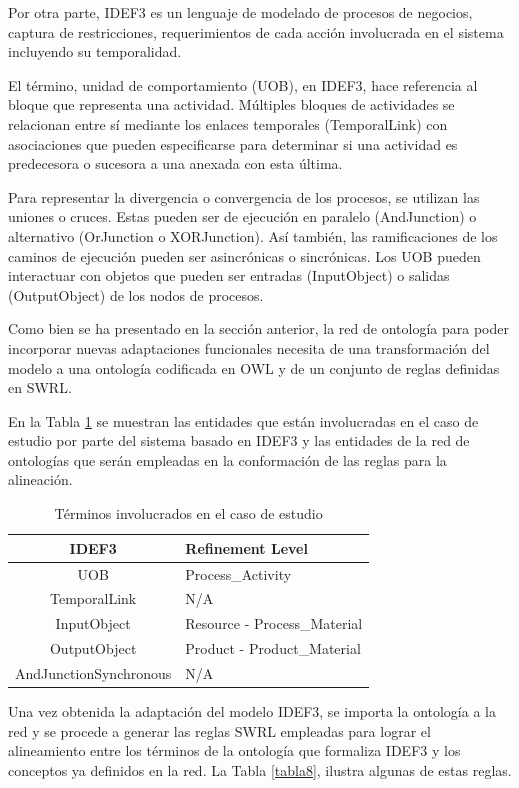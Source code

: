\documentclass[journal]{IEEEtran}
\begin{document}
Por otra parte, IDEF3 es un lenguaje de modelado de procesos de negocios, captura de restricciones, requerimientos de cada acci\'on involucrada en el sistema incluyendo su temporalidad. 

El t\'ermino, unidad de comportamiento (UOB), en IDEF3, hace referencia al bloque que representa una actividad. M\'ultiples bloques de actividades se relacionan entre s\'i mediante los enlaces temporales (TemporalLink) con asociaciones que pueden especificarse para determinar si una actividad es predecesora o sucesora a una anexada con esta \'ultima. 

Para representar la divergencia o convergencia de los procesos, se utilizan las uniones o cruces. Estas pueden ser de ejecuci\'on en paralelo (AndJunction) o alternativo (OrJunction o XORJunction). As\'i tambi\'en, las ramificaciones de los caminos de ejecuci\'on pueden ser asincr\'onicas o sincr\'onicas. Los UOB pueden interactuar con objetos que pueden ser entradas (InputObject) o salidas (OutputObject) de los nodos de procesos. 

Como bien se ha presentado en la secci\'on anterior, la red de ontolog\'ia para poder incorporar nuevas adaptaciones funcionales necesita de una transformaci\'on del modelo a una ontolog\'ia codificada en OWL y de un conjunto de reglas definidas en SWRL.

En la Tabla \ref{tabla7} se muestran las entidades que est\'an involucradas en el caso de estudio por parte del sistema basado en IDEF3 y las entidades de la red de ontolog\'ias que ser\'an empleadas en la conformaci\'on de las reglas para la alineaci\'on.

\begin{table}[!t]
\renewcommand{\arraystretch}{1.3}
\caption{T\'erminos involucrados en el caso de estudio}
\label{tabla7}
\centering
\begin{tabular}{cp{4cm}}
\hline
\hline
IDEF3 &  Refinement Level \\ \hline
UOB & Process\_Activity \\ \cline{1-2}
TemporalLink & N/A \\ \cline{1-2}
InputObject & Resource - Process\_Material \\ \hline   
OutputObject & Product - Product\_Material \\ \hline
AndJunctionSynchronous & N/A \\ 
\hline \hline
\end{tabular}
\end{table}

Una vez obtenida la adaptaci\'on del modelo IDEF3, se importa la ontolog\'ia a la red y se procede a generar las reglas SWRL empleadas para lograr el alineamiento entre los t\'erminos de la ontolog\'ia que formaliza IDEF3 y los conceptos ya definidos en la red. La Tabla \ref{tabla8}, ilustra algunas de estas reglas.
\end{document}
